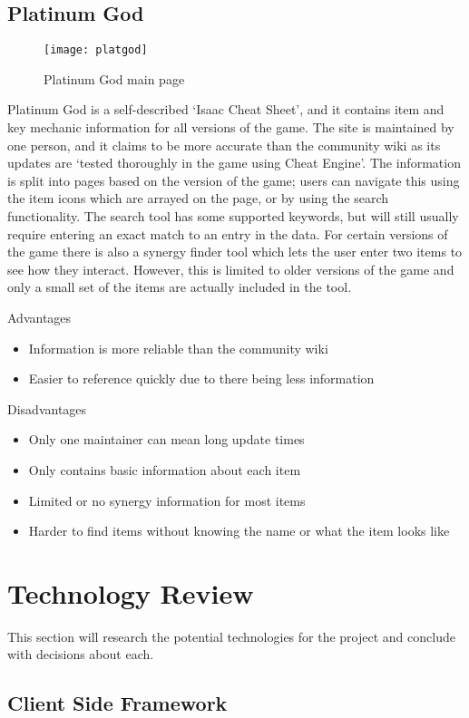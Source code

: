 \subsection*{Platinum God}
\begin{figure}[H]
    \centering
    \texttt{[image: platgod]}
    \caption{Platinum God main page}
\end{figure}
Platinum God is a self-described `Isaac Cheat Sheet'\cite{IsaacCheatSheet}, and it contains item and key mechanic 
information for all versions of the game. The site is maintained by one person, and it claims to be more accurate than 
the community wiki as its updates are `tested thoroughly in the game using Cheat Engine'\cite{FrequentlyAskedQuestions}. 
The information is split into pages based on the version of the game; users can navigate this using the item icons which
 are arrayed on the page, or by using the search functionality. The search tool has some supported keywords, but will 
still usually require entering an exact match to an entry in the data. For certain versions of the game there is also a 
synergy finder tool which lets the user enter two items to see how they interact. However, this is limited to older 
versions of the game and only a small set of the items are actually included in the tool. \par
Advantages
\begin{itemize}
    \item Information is more reliable than the community wiki
    \item Easier to reference quickly due to there being less information
\end{itemize}
Disadvantages
\begin{itemize}
    \item Only one maintainer can mean long update times
    \item Only contains basic information about each item
    \item Limited or no synergy information for most items
    \item Harder to find items without knowing the name or what the item looks like
\end{itemize}
\section{Technology Review}
This section will research the potential technologies for the project and conclude with decisions about each.
\subsection{Client Side Framework}
